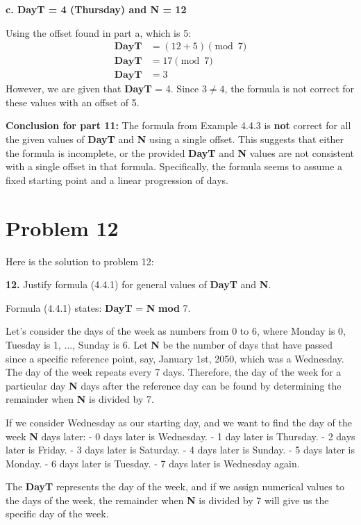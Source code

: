 \documentclass{article}
\begin{document}
\textbf{c. \textbf{DayT} = 4 (Thursday) and \textbf{N} = 12}

Using the offset found in part a, which is 5:
\begin{align} \textbf{DayT} &= (12 + 5) \pmod{7} \\ \textbf{DayT} &= 17 \pmod{7} \\ \textbf{DayT} &= 3 \end{align}
However, we are given that \textbf{DayT} = 4. Since $3 \neq 4$, the formula is not correct for these values with an offset of 5.

\textbf{Conclusion for part 11:}
The formula from Example 4.4.3 is \textbf{not} correct for all the given values of \textbf{DayT} and \textbf{N} using a single offset. This suggests that either the formula is incomplete, or the provided \textbf{DayT} and \textbf{N} values are not consistent with a single offset in that formula. Specifically, the formula seems to assume a fixed starting point and a linear progression of days.

\newpage

\section*{\textbf{Problem 12}}
Here is the solution to problem 12:

\textbf{12.} Justify formula (4.4.1) for general values of \textbf{DayT} and \textbf{N}.

Formula (4.4.1) states: \textbf{DayT} = \textbf{N} \textbf{mod} 7.

Let's consider the days of the week as numbers from 0 to 6, where Monday is 0, Tuesday is 1, ..., Sunday is 6.
Let \textbf{N} be the number of days that have passed since a specific reference point, say, January 1st, 2050, which was a Wednesday.
The day of the week repeats every 7 days. Therefore, the day of the week for a particular day \textbf{N} days after the reference day can be found by determining the remainder when \textbf{N} is divided by 7.

If we consider Wednesday as our starting day, and we want to find the day of the week \textbf{N} days later:
- 0 days later is Wednesday.
- 1 day later is Thursday.
- 2 days later is Friday.
- 3 days later is Saturday.
- 4 days later is Sunday.
- 5 days later is Monday.
- 6 days later is Tuesday.
- 7 days later is Wednesday again.

The \textbf{DayT} represents the day of the week, and if we assign numerical values to the days of the week, the remainder when \textbf{N} is divided by 7 will give us the specific day of the week.
\end{document}
